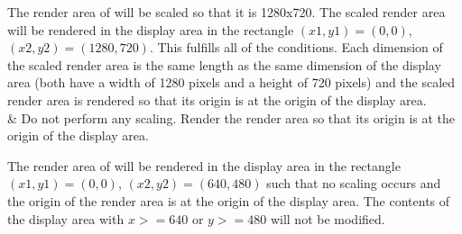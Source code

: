\begin{libreqtab2}
 \enterexample
 The render area of  will be scaled so that it is 1280x720. The scaled render area will be rendered in the display area in the rectangle $(x1,y1) = (0,0)$, $(x2,y2) = (1280,720)$. This fulfills all of the conditions. Each dimension of the scaled render area is the same length as the same dimension of the display area (both have a width of 1280 pixels and a height of 720 pixels) and the scaled render area is rendered so that its origin is at the origin of the display area.
 \exitexample
 \\
 & Do not perform any scaling. Render the render area so that its origin is at the origin of the display area.
 
 \enterexample
 The render area of  will be rendered in the display area in the rectangle $(x1,y1) = (0,0)$, $(x2,y2) = (640,480)$ such that no scaling occurs and the origin of the render area is at the origin of the display area. The contents of the display area with $x >= 640$ or $y >= 480$ will not be modified.
 \exitexample
 \\
\end{libreqtab2}

